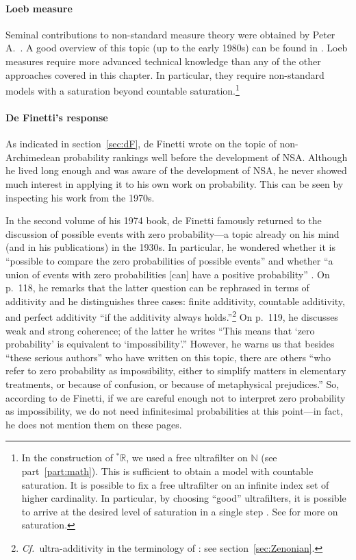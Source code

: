 \paragraph{Loeb measure}
Seminal contributions to non-standard measure theory were obtained by Peter A.~\citet{Loeb:1975}. A good overview of this topic (up to the early 1980s) can be found in \citet{Cutland:1983}. Loeb measures require more advanced technical knowledge than any of the other approaches covered in this chapter. In particular, they require non-standard models with a saturation beyond countable saturation.\footnote{In the construction of ${^\ast\mathbb{R}}$, we used a free ultrafilter on $\mathbb{N}$ (see part~\ref{part:math}). This is sufficient to obtain a model with countable saturation. It is possible to fix a free ultrafilter on an infinite index set of higher cardinality. In particular, by choosing ``good'' ultrafilters, it is possible to arrive at the desired level of saturation in a single step \citep[section~10]{Keisler:2010}. See \citet[pp.~104--108]{HurdLoeb:1985} for more on saturation.}

\paragraph{De Finetti's response\label{sec:dF2}}
As indicated in section~\ref{sec:dF}, de Finetti wrote on the topic of non-Archimedean probability rankings well before the development of NSA. Although he lived long enough and was aware of the development of NSA, he never showed much interest in applying it to his own work on probability. This can be seen by inspecting his work from the 1970s.

In the second volume of his 1974 book, de Finetti famously returned to the discussion of possible events with zero probability---a topic already on his mind (and in his publications) in the 1930s.
In particular, he wondered whether it is ``possible to compare the zero probabilities of possible events'' and whether ``a union of events with zero probabilities [can] have a positive probability'' \citep[Vol.~II, p.~117]{deFinetti:1974}.
On p.~118, he remarks that the latter question can be rephrased in terms of additivity and he distinguishes three cases: finite additivity, countable additivity, and perfect additivity ``if the additivity always holds.''\footnote{\textit{Cf.}\ ultra-additivity in the terminology of \citet{Skyrms:1983a}: see section~\ref{sec:Zenonian}.}
On p.~119, he discusses weak and strong coherence; of the latter he writes ``This means that `zero probability' is equivalent to `impossibility'.'' However, he warns us that besides ``these serious authors'' who have written on this topic, there are others ``who refer to zero probability as impossibility, either to simplify matters in elementary treatments, or because of confusion, or because of metaphysical prejudices.''
So, according to de Finetti, if we are careful enough not to interpret zero probability as impossibility, we do not need infinitesimal probabilities at this point---in fact, he does not mention them on these pages.

